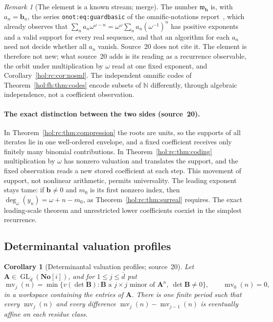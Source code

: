 \documentclass[11pt]{article}
\numberwithin{equation}{section}
\newtheorem{corollary}[theorem]{Corollary}
\theoremstyle{definition}
\theoremstyle{remark}
\newtheorem{remark}[theorem]{Remark}
\newcommand{\N}{\mathbb N}
\newcommand{\No}{\mathbf{No}}
\begin{document}
\begin{remark}[The element is a known stream; merge]\label{hol:rc:rem:stream}
The number $\mathfrak w_{\mathbf b}$ is, with $a_n=\mathbf b_n$, the series
\texttt{onot:eq:guardbasic} of the omnific-notations report~\cite{repoonot},
which already observes that $\sum_na_n\omega^{\omega-n}=
\omega^\omega\sum_na_n(\omega^{-1})^n$ has positive exponents and a valid
support for every real sequence, and that an algorithm for each $a_n$ need
not decide whether all $a_n$ vanish. Source~20 does not cite it. The element
is therefore not new; what source~20 adds is its reading as a recurrence
observable, the orbit under multiplication by $\omega$ read at one fixed
exponent, and Corollary~\ref{hol:rc:cor:nosml}. The independent omnific codes
of Theorem~\ref{hol:fh:thm:codes} encode subsets of $\N$ differently, through
algebraic independence, not a coefficient observation.
\end{remark}

\paragraph{The exact distinction between the two sides (source~20).}
In Theorem~\ref{hol:rc:thm:compression} the roots are units, so the supports of
all iterates lie in one well-ordered envelope, and a fixed coefficient receives
only finitely many binomial contributions. In
Theorem~\ref{hol:rc:thm:coding} multiplication by $\omega$ has nonzero
valuation and translates the support, and the fixed observation reads a new
stored coefficient at each step. This movement of support, not nonlinear
arithmetic, permits universality. The leading exponent stays tame: if
$\mathbf b\ne0$ and $m_0$ is its first nonzero index, then
$\deg_\omega(y_n)=\omega+n-m_0$, as Theorem~\ref{hol:rc:thm:surreal}
requires. The exact leading-scale theorem and unrestricted lower coefficients
coexist in the simplest recurrence.

\subsection{Determinantal valuation profiles}\label{hol:rc:sub:matrix}

\begin{corollary}[Determinantal valuation profiles; source~20]
\label{hol:rc:cor:matrix}
Let $\mathbf A\in\operatorname{GL}_{\bar d}(\No[i])$, and for
$1\le j\le\bar d$ put
\[
 \operatorname{mv}_j(n)=\min\{v(\det\mathbf B):\mathbf B\text{ a }j\times j
 \text{ minor of }\mathbf A^n,\ \det\mathbf B\ne0\},\qquad
 \operatorname{mv}_0(n)=0,
\]
in a workspace containing the entries of $\mathbf A$. There is one finite
period such that every $\operatorname{mv}_j(n)$ and every difference
$\operatorname{mv}_j(n)-\operatorname{mv}_{j-1}(n)$ is eventually affine on each
residue class.
\end{corollary}
\end{document}
